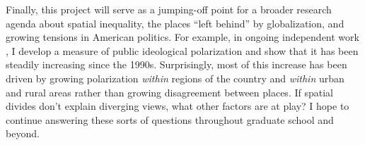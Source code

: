 \documentclass{grad-statement}
\begin{document}
Finally, this project will serve as a jumping-off point for a broader research agenda about spatial inequality, the places ``left behind'' by globalization, and growing tensions in American politics.
For example, in ongoing independent work \parencite{pattison-2025-polarization}, I develop a measure of public ideological polarization and show that it has been steadily increasing since the 1990s.
Surprisingly, most of this increase has been driven by growing polarization \emph{within} regions of the country and \emph{within} urban and rural areas rather than growing disagreement between places.
If spatial divides don't explain diverging views, what other factors are at play?
I hope to continue answering these sorts of questions throughout graduate school and beyond.

\printbibliography
\end{document}
